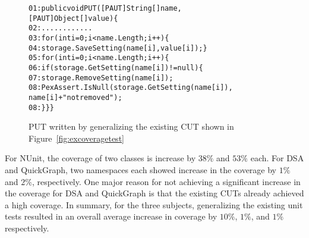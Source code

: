 \begin{figure}[t]
\begin{CodeOut}
\begin{alltt}
01: public void PUT([PAUT]String[] name, 
\hspace*{1.7in}[PAUT]Object[] value) \{
02: \hspace*{0.07in}............
03: \hspace*{0.07in}for (int i = 0; i < name.Length; i++) \{
04: \hspace*{0.22in}storage.SaveSetting(name[i], value[i]); \}
05: \hspace*{0.07in}for (int i = 0; i < name.Length; i++) \{
06: \hspace*{0.17in}if (storage.GetSetting(name[i]) != null) \{
07: \hspace*{0.3in}storage.RemoveSetting(name[i]);
08: \hspace*{0.3in}PexAssert.IsNull(storage.GetSetting(name[i]), 
\hspace*{1.5in}name[i] + " not removed"); 
08: \hspace*{0.1in}\}\}\}
\end{alltt}
\end{CodeOut}
\caption{PUT written by generalizing the existing CUT shown in Figure~\ref{fig:excoveragetest}}%
\label{fig:excoveragePUT}%
\end{figure}

For NUnit, the coverage of two classes is increase by $38\%$ and $53\%$ each. For DSA and QuickGraph, two namespaces each showed increase in the coverage by $1\%$ and $2\%$, respectively. One major reason for not achieving a significant increase in the coverage for DSA and QuickGraph is that the existing CUTs already achieved a high coverage. In summary, for the three subjects, generalizing the existing unit tests resulted in an overall average increase in coverage by $10\%$, $1\%$, and $1\%$ respectively. 

